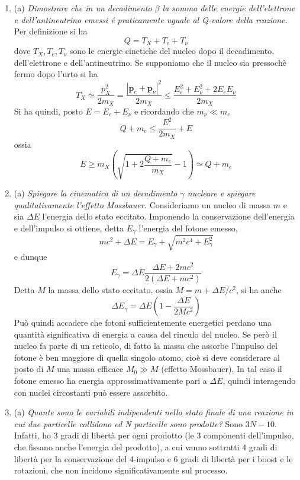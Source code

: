 \documentclass{article}
\renewcommand{\a}{(a)}
\renewcommand{\t}[1]{\textit{ #1}}
\renewcommand{\vec}[1]{\mathbf{#1}}
\begin{document}
\begin{enumerate}
{	ad interazioni deboli, elettromagnetiche, forti?} Per le interazioni deboli e elettromagnetiche la vita media dipende marcatamente dall'energia ($10^3$ s per il decadimento $\alpha$, $10^{-16}$ s per il decadimento $\beta$). Per le interazioni forti è dell'ordine di $10^{-23}$ s.
\item\a\t{Dimostrare che in un decadimento $\beta$ la somma delle energie dell'elettrone e
	dell'antineutrino emessi é praticamente uguale al Q-valore della reazione.} Per definizione si ha
\[Q=T_X+T_e+T_\nu\]
dove $T_X,T_e,T_\nu$ sono le energie cinetiche del nucleo dopo il decadimento, dell'elettrone e dell'antineutrino. Se supponiamo che il nucleo sia pressochè fermo dopo l'urto si ha
\[T_X\simeq\frac{p_X^2}{2m_X}=\frac{|\vec{p}_e+\vec{p}_\nu|^2}{2m_X}\leq\frac{E_e^2+E_\nu^2+2E_eE_\nu}{2m_X}\]
Si ha quindi, posto $E=E_e+E_\nu$ e ricordando che $m_\nu\ll m_e$
\[Q+m_e\leq\frac{E^2}{2m_X}+E\]
ossia
\[E\geq m_X\left(\sqrt{1+2\frac{Q+m_e}{m_X}}-1\right)\simeq Q+m_e\]
\item\a\t{Spiegare la cinematica di un decadimento $\gamma$ nucleare e spiegare qualitativamente
	l'effetto Mossbauer.} Consideriamo un nucleo di massa $m$ e sia $\Delta E$ l'energia dello stato eccitato. Imponendo la conservazione dell'energia e dell'impulso si ottiene, detta $E_\gamma$ l'energia del fotone emesso,
\[mc^2+\Delta E=E_\gamma+\sqrt{m^2c^4+E_\gamma^2}\]
e dunque
\[E_\gamma=\Delta E\frac{\Delta E+2mc^2}{2(\Delta E+mc^2)}\]
Detta $M$ la massa dello stato eccitato, ossia $M=m+\Delta E/c^2$, si ha anche
\[\Delta E_\gamma=\Delta E\left(1-\frac{\Delta E}{2Mc^2}\right)\]
Può quindi accadere che fotoni sufficientemente energetici perdano una quantità significativa di energia a causa del rinculo del nucleo. Se però il nucleo fa parte di un reticolo, di fatto la massa che assorbe l'impulso del fotone è ben maggiore di quella singolo atomo, cioè si deve considerare al posto di $M$ una massa efficace $M_0\gg M$ (effetto Mossbauer). In tal caso il fotone emesso ha energia approssimativamente pari a $\Delta E$, quindi interagendo con nuclei circostanti può essere assorbito.
\item\a\t{Quante sono le variabili indipendenti nello stato finale di una reazione in cui due
	particelle collidono ed N particelle sono prodotte?} Sono $3N-10$. Infatti, ho 3 gradi di libertà per ogni prodotto (le 3 componenti dell'impulso, che fissano anche l'energia del prodotto), a cui vanno sottratti 4 gradi di libertà per la conservazione del 4-impulso e 6 gradi di libertà per i boost e le rotazioni, che non incidono significativamente sul processo.

\end{enumerate}
\end{document}
